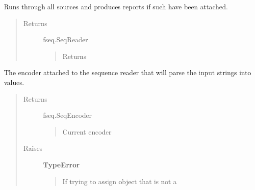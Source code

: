 \documentclass[letterpaper,10pt,english]{sphinxmanual}
\begin{document}
\begin{fulllineitems}
\begin{fulllineitems}
\end{fulllineitems}


\begin{fulllineitems}
\label{fseq.reading:fseq.reading.seq_reader.SeqReader.run}
Runs through all sources and produces reports if such have been
attached.
\begin{quote}\begin{description}
\item[{Returns}] \leavevmode
fseq.SeqReader
\begin{quote}

Returns 
\end{quote}

\end{description}\end{quote}

\end{fulllineitems}


\begin{fulllineitems}
\label{fseq.reading:fseq.reading.seq_reader.SeqReader.seqEncoder}
The encoder attached to the sequence reader that will parse the
input strings into values.
\begin{quote}\begin{description}
\item[{Returns}] \leavevmode
fseq.SeqEncoder
\begin{quote}

Current encoder
\end{quote}

\item[{Raises}] \leavevmode
\textbf{TypeError}
\begin{quote}

If trying to assign object that is not a 
\end{quote}

\end{description}\end{quote}

\end{fulllineitems}


\begin{fulllineitems}
\label{fseq.reading:fseq.reading.seq_reader.SeqReader.verbose}
\end{fulllineitems}


\end{fulllineitems}
\end{document}
